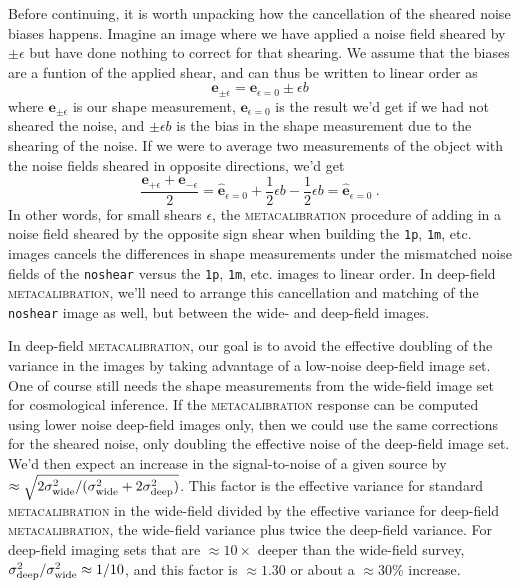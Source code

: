 \documentclass[twocolumn]{openjournal}
\makeatletter
\newcommand{\mcal}{\textsc{metacalibration}\@\xspace}
\newcommand{\noshear}{\texttt{noshear}\@\xspace}
\makeatother
\begin{document}
Before continuing, it is worth unpacking how the cancellation of the sheared noise
biases happens.  Imagine an image where we have applied a noise field sheared by
$\pm\epsilon$ but have done nothing to correct for that shearing.  We assume
that the biases are a funtion of the applied shear, and can thus be written
to linear order as
\begin{equation*}
\mathbf{e}_{\pm\epsilon} = \mathbf{e}_{\epsilon=0} \pm \epsilon b
\end{equation*}
where $\mathbf{e}_{\pm\epsilon}$ is our shape measurement,
$\mathbf{e}_{\epsilon=0}$ is the result we'd get if we had not sheared the noise, and
$\pm \epsilon b$ is the bias in the shape measurement due to the shearing of the noise.
If we were to average two measurements of the object with the noise fields sheared in
opposite directions, we'd get
\begin{equation*}
\frac{\mathbf{e}_{+\epsilon} + \mathbf{e}_{-\epsilon}}{2}
= \hat{\mathbf{e}}_{\epsilon=0} + \frac{1}{2}\epsilon b - \frac{1}{2}\epsilon b
= \hat{\mathbf{e}}_{\epsilon=0}\ .
\end{equation*}
In other words, for small shears $\epsilon$, the \mcal procedure of adding in a noise
field sheared by the opposite sign shear when building the \texttt{1p}, \texttt{1m}, etc.
images cancels the differences in shape measurements under the mismatched noise fields
of the \noshear versus the \texttt{1p}, \texttt{1m}, etc. images to linear order. In
deep-field \mcal, we'll need to arrange this cancellation and matching of the \noshear
image as well, but between the wide- and deep-field images.

In deep-field \mcal, our goal is to avoid the effective doubling of the variance in the
images by taking advantage of a low-noise deep-field image set. One of course still
needs the shape measurements from the wide-field image set for cosmological inference.
If the \mcal response can be computed using lower noise
deep-field images only, then we could use the same corrections for the sheared
noise, only doubling the effective noise of the deep-field image set. We'd then expect
an increase in the signal-to-noise of a given source by
$\approx\sqrt{2\sigma^2_{\rm wide}/(\sigma^2_{\rm wide} + 2\sigma^2_{\rm deep})}$.
This factor is the effective variance for standard \mcal in the wide-field divided by
the effective variance for deep-field \mcal, the wide-field variance plus twice the
deep-field variance. For deep-field imaging sets that are $\approx10\times$ deeper than
the wide-field survey, $\sigma^{2}_{\rm deep}/\sigma^{2}_{\rm wide}\approx 1/10$, and
this factor is $\approx1.30$ or about a $\approx30\%$ increase.
\end{document}
